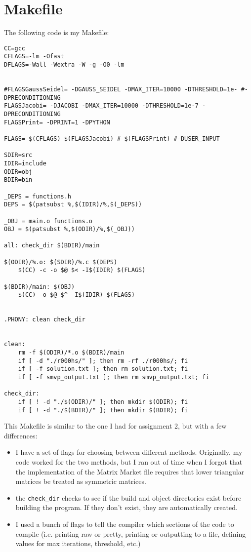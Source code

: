 \documentclass[12pt]{article}
\begin{document}
    \newpage

    \section{Makefile}

    The following code is my Makefile:

    \begin{verbatim}
CC=gcc
CFLAGS=-lm -Ofast
DFLAGS=-Wall -Wextra -W -g -O0 -lm


#FLAGSGaussSeidel= -DGAUSS_SEIDEL -DMAX_ITER=10000 -DTHRESHOLD=1e- #-DPRECONDITIONING
FLAGSJacobi= -DJACOBI -DMAX_ITER=10000 -DTHRESHOLD=1e-7 -DPRECONDITIONING
FLAGSPrint= -DPRINT=1 -DPYTHON

FLAGS= $(CFLAGS) $(FLAGSJacobi) # $(FLAGSPrint) #-DUSER_INPUT

SDIR=src
IDIR=include
ODIR=obj
BDIR=bin

_DEPS = functions.h
DEPS = $(patsubst %,$(IDIR)/%,$(_DEPS))

_OBJ = main.o functions.o
OBJ = $(patsubst %,$(ODIR)/%,$(_OBJ))

all: check_dir $(BDIR)/main

$(ODIR)/%.o: $(SDIR)/%.c $(DEPS)
	$(CC) -c -o $@ $< -I$(IDIR) $(FLAGS)

$(BDIR)/main: $(OBJ)
	$(CC) -o $@ $^ -I$(IDIR) $(FLAGS)


.PHONY: clean check_dir


clean:
	rm -f $(ODIR)/*.o $(BDIR)/main
	if [ -d "./r000hs/" ]; then rm -rf ./r000hs/; fi
	if [ -f solution.txt ]; then rm solution.txt; fi
	if [ -f smvp_output.txt ]; then rm smvp_output.txt; fi

check_dir:
	if [ ! -d "./$(ODIR)/" ]; then mkdir $(ODIR); fi
	if [ ! -d "./$(BDIR)/" ]; then mkdir $(BDIR); fi

    \end{verbatim}

    This Makefile is similar to the one I had for assignment 2, but with a few differences:
    \begin{itemize}
        \item I have a set of flags for choosing between different methods. Originally, my code worked for the two methods, but I ran out of time when I forgot that the implementation of the Matrix Market file requires that lower triangular matrices be treated as symmetric matrices.
        \item the \verb|check_dir| checks to see if the build and object directories exist before building the program. If they don't exist, they are automatically created.
        \item I used a bunch of flags to tell the compiler which sections of the code to compile (i.e. printing raw or pretty, printing or outputting to a file, defining values for max iterations, threshold, etc.)
    \end{itemize}

    

	
\end{document}
